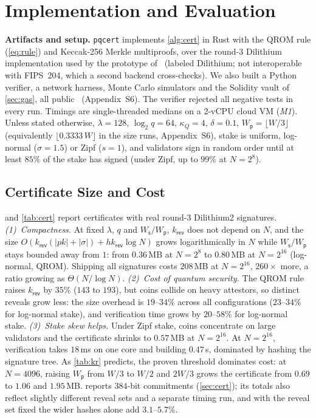 \documentclass[10pt,journal,compsoc]{IEEEtran}
\theoremstyle{tplain}
\theoremstyle{tdef}
\theoremstyle{remark}
\newcommand{\supp}[1]{Appendix~#1}
\newcommand{\Ws}{W_{\mathsf{s}}}
\newcommand{\Wp}{W_{\mathsf{p}}}
\newcommand{\kr}{k_{\mathsf{rev}}}
\begin{document}
\section{Implementation and Evaluation}\label{sec:eval}

\noindent\textbf{Artifacts and setup.} \texttt{pqcert} implements \cref{alg:cert} in Rust with the QROM rule (\cref{eq:rule}) and Keccak-256 Merkle multiproofs, over the round-3 Dilithium implementation used by the prototype of~\cite{NIROPoK2025} (labeled Dilithium; not interoperable with FIPS~204, which a second backend cross-checks). We also built a Python verifier, a network harness, Monte Carlo simulators and the Solidity vault of \cref{sec:gas}, all public~\cite{pqvault_artifact} (\supp{S6}). The verifier rejected all negative tests in every run. Timings are single-threaded medians on a 2-vCPU cloud VM (\emph{M1}). Unless stated otherwise, $\lambda=128$, $\log_2 q=64$, $\kappa_Q=4$, $\delta=0.1$, $\Wp=\lfloor W/3\rfloor$ (equivalently $\lfloor 0.3333\,W\rfloor$ in the size runs, \supp{S6}), stake is uniform, log-normal ($\sigma=1.5$) or Zipf ($s=1$), and validators sign in random order until at least $85\%$ of the stake has signed (under Zipf, up to $99\%$ at $N=2^8$).

\subsection{Certificate Size and Cost}
 and \cref{tab:cert} report certificates with real round-3 Dilithium2 signatures.
\emph{(1)~Compactness.} At fixed $\lambda$, $q$ and $\Ws/\Wp$, $\kr$ does not depend on $N$, and the size $O(\kr(|pk|+|\sigma|)+h\kr\log N)$ grows logarithmically in $N$ while $\Ws/\Wp$ stays bounded away from $1$: from $0.36$\,MB at $N=2^8$ to $0.80$\,MB at $N=2^{16}$ (log-normal, QROM). Shipping all signatures costs $208$\,MB at $N=2^{16}$, $260\times$ more, a ratio growing as $\Theta(N/\log N)$.
\emph{(2)~Cost of quantum security.} The QROM rule raises $\kr$ by $35\%$ ($143$ to $193$), but coins collide on heavy attestors, so distinct reveals grow less: the size overhead is $19$--$34\%$ across all configurations ($23$--$34\%$ for log-normal stake), and verification time grows by $20$--$58\%$ for log-normal stake.
\emph{(3)~Stake skew helps.} Under Zipf stake, coins concentrate on large validators and the certificate shrinks to $0.57$\,MB at $N=2^{16}$.
At $N=2^{16}$, verification takes $18$\,ms on one core and building $0.47$\,s, dominated by hashing the signature tree. As \cref{tab:kr} predicts, the proven threshold dominates cost: at $N=4096$, raising $\Wp$ from $W/3$ to $W/2$ and $2W/3$ grows the certificate from $0.69$ to $1.06$ and $1.95$\,MB.  reports $384$-bit commitments (\cref{sec:cert}); its totals also reflect slightly different reveal sets and a separate timing run, and with the reveal set fixed the wider hashes alone add $3.1$--$5.7\%$.
\end{document}
